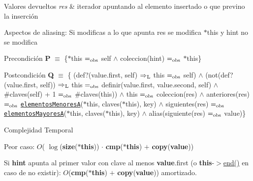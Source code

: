 \begin{DoxyRetVals}{Valores devueltos}
{\em res} & iterador apuntando al elemento insertado o que previno la inserción\\
\hline
\end{DoxyRetVals}
\begin{DoxyParagraph}{Aspectos de aliasing\+:}
Si modificas a lo que apunta res se modifica $\ast$this y hint no se modifica
\end{DoxyParagraph}
\begin{DoxyPrecond}{Precondición}
{\bfseries P} $\equiv$ \{$\ast$this $=_{\rm obs}$ self $\land$ coleccion(hint) $=_{\rm obs}$ $\ast$this\} 
\end{DoxyPrecond}
\begin{DoxyPostcond}{Postcondición}
{\bfseries Q} $\equiv$ \{ (def?(value.\+first, self) $\Rightarrow_{\rm L}$ this $=_{\rm obs}$ self) $\land$ (not(def?(value.\+first, self)) $\Rightarrow_{\rm L}$ this $=_{\rm obs}$ definir(value.\+first, value.\+second, self) $\land$ \#claves(self) + 1 $=_{\rm obs}$ \#claves(this)) $\land$ this $=_{\rm obs}$ coleccion(res) $\land$ anteriores(res) $=_{\rm obs}$ \href{axiomas.html#elementosMenoresA}{\tt elementos\+MenoresA}($\ast$this, claves($\ast$this), key) $\land$ siguientes(res) $=_{\rm obs}$ \href{axiomas.html#elementosMayoresA}{\tt elementos\+MayoresA}($\ast$this, claves($\ast$this), key) $\land$ alias(siguiente(res) $=_{\rm obs}$ value)\}
\end{DoxyPostcond}

\begin{DoxyDescription}
\item[Complejidad Temporal]
\begin{DoxyItemize}
\item Peor caso\+: $O$( $\log$({\bfseries size}({\bfseries $\ast$this})) $\cdot$ {\bfseries cmp}({\bfseries $\ast$this}) $+$ {\bfseries copy}({\bfseries value}))
\item Si {\bfseries hint} apunta al primer valor con clave al menos {\bfseries value}.first (o {\bfseries this}-\/$>$\hyperlink{classaed2_1_1map_a76023e6a56cb625513e1b5ea028bf983_a76023e6a56cb625513e1b5ea028bf983}{end()} en caso de no existir)\+: $O$({\bfseries cmp}({\bfseries $\ast$this}) $+$ {\bfseries copy}({\bfseries value})) amortizado. 
\end{DoxyItemize}
\end{DoxyDescription}

